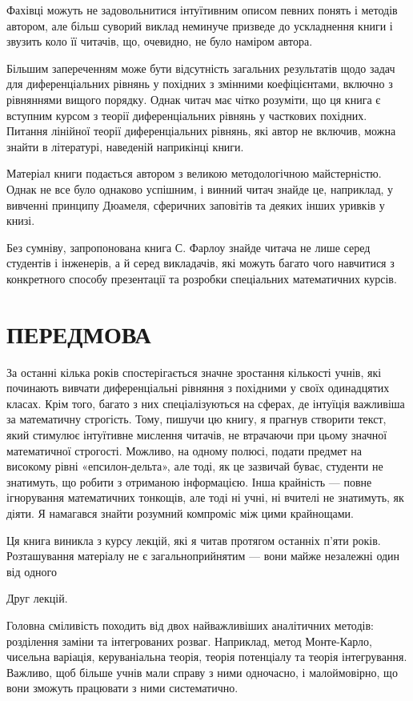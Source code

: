 \documentclass[
  ukrainian,
]{article}
\begin{document}
Фахівці можуть не задовольнитися інтуїтивним описом певних понять і
методів автором, але більш суворий виклад неминуче призведе до
ускладнення книги і звузить коло її читачів, що, очевидно, не було
наміром автора.

Більшим запереченням може бути відсутність загальних результатів щодо
задач для диференціальних рівнянь у похідних з змінними коефіцієнтами,
включно з рівняннями вищого порядку. Однак читач має чітко розуміти, що
ця книга є вступним курсом з теорії диференціальних рівнянь у часткових
похідних. Питання лінійної теорії диференціальних рівнянь, які автор не
включив, можна знайти в літературі, наведеній наприкінці книги.

Матеріал книги подається автором з великою методологічною майстерністю.
Однак не все було однаково успішним, і винний читач знайде це,
наприклад, у вивченні принципу Дюамеля, сферичних заповітів та деяких
інших уривків у книзі.

Без сумніву, запропонована книга С. Фарлоу знайде читача не лише серед
студентів і інженерів, а й серед викладачів, які можуть багато чого
навчитися з конкретного способу презентації та розробки спеціальних
математичних курсів.

\section{ПЕРЕДМОВА}\label{ux43fux435ux440ux435ux434ux43cux43eux432ux430}

За останні кілька років спостерігається значне зростання кількості
учнів, які починають вивчати диференціальні рівняння з похідними у своїх
одинадцятих класах. Крім того, багато з них спеціалізуються на сферах,
де інтуїція важливіша за математичну строгість. Тому, пишучи цю книгу, я
прагнув створити текст, який стимулює інтуїтивне мислення читачів, не
втрачаючи при цьому значної математичної строгості. Можливо, на одному
полюсі, подати предмет на високому рівні «епсилон-дельта», але тоді, як
це зазвичай буває, студенти не знатимуть, що робити з отриманою
інформацією. Інша крайність --- повне ігнорування математичних тонкощів,
але тоді ні учні, ні вчителі не знатимуть, як діяти. Я намагався знайти
розумний компроміс між цими крайнощами.

Ця книга виникла з курсу лекцій, які я читав протягом останніх п'яти
років. Розташування матеріалу не є загальноприйнятим --- вони майже
незалежні один від одного

Друг лекцій.

Головна сміливість походить від двох найважливіших аналітичних методів:
розділення заміни та інтегрованих розваг. Наприклад, метод Монте-Карло,
чисельна варіація, керуваніальна теорія, теорія потенціалу та теорія
інтегрування. Важливо, щоб більше учнів мали справу з ними одночасно, і
малоймовірно, що вони зможуть працювати з ними систематично.
\end{document}

